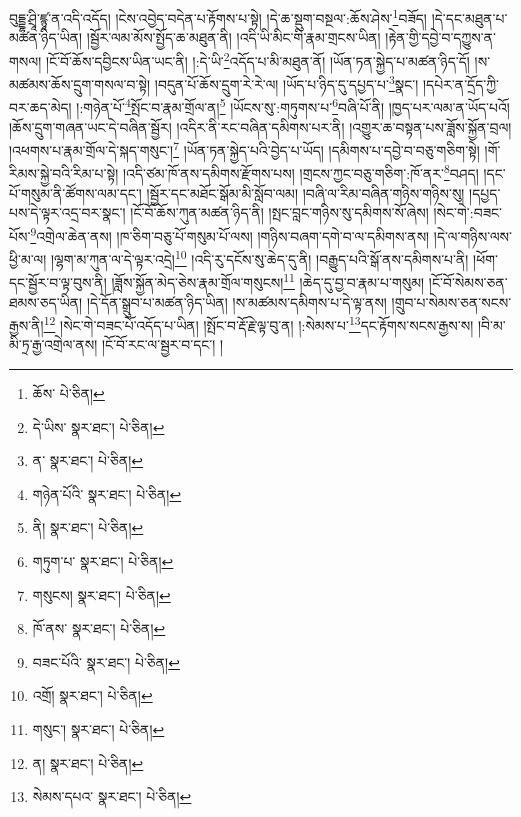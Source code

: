 བུདྡྷ་ཤྲཱི་ཛྙཱ་ན་འདི་འདོད། །ངེས་འབྱེད་བདེན་པ་རྟོགས་པ་སྟེ། །དེ་ཆ་སྡུག་བསྔལ་:ཆོས་ཤེས་\footnote{ཆོས་  པེ་ཅིན། }བཟོད། །དེ་དང་མཐུན་པ་མཚན་ཉིད་ཡིན། །སྦྱོར་ལམ་མོས་སྤྱོད་ཆ་མཐུན་ནི། །འདི་ཡི་མིང་གི་རྣམ་གྲངས་ཡིན། །རྟེན་གྱི་དབྱེ་བ་དཀྱུས་ན་གསལ། །ངོ་བོ་ཆོས་དབྱིངས་ཡིན་ཡང་ནི། །:དེ་ཡི་\footnote{དེ་ཡིས་  སྣར་ཐང་།  པེ་ཅིན། }འདོད་པ་མི་མཐུན་ནོ། །ཡོན་ཏན་སྐྱེད་པ་མཚན་ཉིད་དོ། །ས་མཚམས་ཆོས་དྲུག་གསལ་བ་སྟེ། །བདུན་པོ་ཆོས་དྲུག་རེ་རེ་ལ། །ཡོད་པ་ཉིད་དུ་དཔྱད་པ་\footnote{ན་  སྣར་ཐང་།  པེ་ཅིན། }སྣང་། །དཔེར་ན་དྲོད་ཀྱི་བར་ཆད་མེད། །:གཉེན་པོ་\footnote{གཉེན་པོའི་  སྣར་ཐང་།  པེ་ཅིན། }སྤོང་བ་རྣམ་གྲོལ་ན།\footnote{ནི།  སྣར་ཐང་།  པེ་ཅིན། } །ཡོངས་སུ་:གཏུགས་པ་\footnote{གཏུག་པ་  སྣར་ཐང་།  པེ་ཅིན། }བཞི་པོ་ནི། །ཁྱད་པར་ལམ་ན་ཡོད་པའོ། །ཆོས་དྲུག་གཞན་ཡང་དེ་བཞིན་སྦྱོར། །འདིར་ནི་རང་བཞིན་དམིགས་པར་ནི། །འགྱུར་ཆ་བསྟན་པས་ཟློས་སྐྱོན་བྲལ། །འཕགས་པ་རྣམ་གྲོལ་དེ་སྐད་གསུང་།\footnote{གསུངས།  སྣར་ཐང་།  པེ་ཅིན། } །ཡོན་ཏན་སྐྱེད་པའི་བྱེད་པ་ཡོད། །དམིགས་པ་དབྱེ་བ་བཅུ་གཅིག་སྟེ། །གོ་རིམས་སྐྱེ་བའི་རིམ་པ་སྟེ། །འདི་ཙམ་ཁོ་ནས་དམིགས་རྫོགས་པས། །གྲངས་ཀྱང་བཅུ་གཅིག་:ཁོ་ནར་\footnote{ཁོ་ནས་  སྣར་ཐང་།  པེ་ཅིན། }བཤད། །དང་པོ་གསུམ་ནི་ཚོགས་ལམ་དང་། །སྦྱོར་དང་མཐོང་སྒོམ་མི་སློབ་ལམ། །བཞི་ལ་རིམ་བཞིན་གཉིས་གཉིས་སུ། །དཔྱད་པས་དེ་ལྟར་འདྲ་བར་སྣང་། །ངོ་བོ་ཆོས་ཀུན་མཚན་ཉིད་ནི། །སྤང་བླང་གཉིས་སུ་དམིགས་སོ་ཞེས། །སེང་གེ་:བཟང་པོས་\footnote{བཟང་པོའི་  སྣར་ཐང་།  པེ་ཅིན། }འགྲེལ་ཆེན་ནས། །ཁ་ཅིག་བཅུ་པོ་གསུམ་པོ་ལས། །གཉིས་བཞག་དགེ་བ་ལ་དམིགས་ནས། །དེ་ལ་གཉིས་ལས་ཕྱི་མ་ལ། །ལྷག་མ་ཀུན་ལ་དེ་ལྟར་འདྲེ།\footnote{འགྲོ།  སྣར་ཐང་།  པེ་ཅིན། } །འདི་རུ་དངོས་སུ་ཆེད་དུ་ནི། །བརྒྱུད་པའི་སྒོ་ནས་དམིགས་པ་ནི། །ཕོག་དང་སྦྱོར་བ་ལྟ་བུས་ནི། །ཟློས་སྐྱོན་མེད་ཅེས་རྣམ་གྲོལ་གསུངས།\footnote{གསུང་།  སྣར་ཐང་།  པེ་ཅིན། } །ཆེད་དུ་བྱ་བ་རྣམ་པ་གསུམ། །ངོ་བོ་སེམས་ཅན་ཐམས་ཅད་ཡིན། །དེ་དོན་སྒྲུབ་པ་མཚན་ཉིད་ཡིན། །ས་མཚམས་དམིགས་པ་དེ་ལྟ་ནས། །གྲུབ་པ་སེམས་ཅན་སངས་རྒྱས་ནི།\footnote{ན།  སྣར་ཐང་།  པེ་ཅིན། } །སེང་གེ་བཟང་པོ་འདོད་པ་ཡིན། །སྤོང་བ་རྡོ་རྗེ་ལྟ་བུ་ན། །:སེམས་པ་\footnote{སེམས་དཔའ་  སྣར་ཐང་།  པེ་ཅིན། }དང་རྟོགས་སངས་རྒྱས་ས། །བི་མ་མི་ཏྲ་རྒྱ་འགྲེལ་ནས། །ངོ་བོ་རང་ལ་སྦྱར་བ་དང་། །
